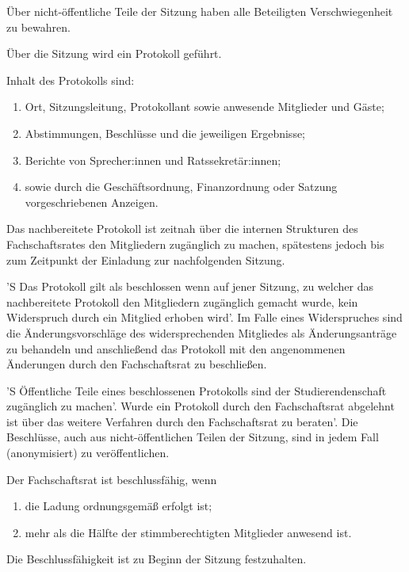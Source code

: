 \documentclass[%
    parskip=half,
]{scrartcl}
\begin{document}
\begin{contract}
Über nicht-öffentliche Teile der Sitzung haben alle Beteiligten Verschwiegenheit zu bewahren.


Über die Sitzung wird ein Protokoll geführt.

Inhalt des Protokolls sind:
\begin{enumerate}[\qquad a)]
    \item Ort, Sitzungsleitung, Protokollant sowie anwesende Mitglieder und Gäste;
    \item Abstimmungen, Beschlüsse und die jeweiligen Ergebnisse;
    \item Berichte von Sprecher:innen und Ratssekretär:innen;
    \item sowie durch die Geschäftsordnung, Finanzordnung oder Satzung vorgeschriebenen Anzeigen.
\end{enumerate}

Das nachbereitete Protokoll ist zeitnah über die internen Strukturen des Fachschaftsrates den Mitgliedern zugänglich zu machen, spätestens jedoch bis zum Zeitpunkt der Einladung zur nachfolgenden Sitzung.

'S Das Protokoll gilt als beschlossen wenn auf jener Sitzung, zu welcher das nachbereitete Protokoll den Mitgliedern zugänglich gemacht wurde, kein Widerspruch durch ein Mitglied erhoben wird'.
Im Falle eines Widerspruches sind die Änderungsvorschläge des widersprechenden Mitgliedes als Änderungsanträge zu behandeln und anschließend das Protokoll mit den angenommenen Änderungen durch den Fachschaftsrat zu beschließen.

'S Öffentliche Teile eines beschlossenen Protokolls sind der Studierendenschaft zugänglich zu machen'.
Wurde ein Protokoll durch den Fachschaftsrat abgelehnt ist über das weitere Verfahren durch den Fachschaftsrat zu beraten'.
Die Beschlüsse, auch aus nicht-öffentlichen Teilen der Sitzung, sind in jedem Fall (anonymisiert) zu veröffentlichen.


Der Fachschaftsrat ist beschlussfähig, wenn
\begin{enumerate}[\qquad a)]
    \item die Ladung ordnungsgemäß erfolgt ist; %
    \item mehr als die Hälfte der stimmberechtigten Mitglieder anwesend ist.
\end{enumerate}

Die Beschlussfähigkeit ist zu Beginn der Sitzung festzuhalten.


\end{contract}
\end{document}
